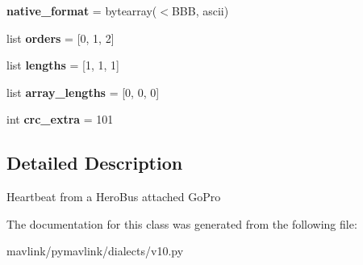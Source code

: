 \begin{DoxyCompactItemize}
{\bfseries native\+\_\+format} = bytearray(\textquotesingle{}$<$B\+BB\textquotesingle{}, \textquotesingle{}ascii\textquotesingle{})
\item 
\mbox{\label{classpymavlink_1_1dialects_1_1v10_1_1MAVLink__gopro__heartbeat__message_a92170198ee2f3575b033a66e56b8da65}} 
list {\bfseries orders} = \mbox{[}0, 1, 2\mbox{]}
\item 
\mbox{\label{classpymavlink_1_1dialects_1_1v10_1_1MAVLink__gopro__heartbeat__message_a717c5d1b495c1ee70707bc9bec2da856}} 
list {\bfseries lengths} = \mbox{[}1, 1, 1\mbox{]}
\item 
\mbox{\label{classpymavlink_1_1dialects_1_1v10_1_1MAVLink__gopro__heartbeat__message_a57c28634d53be667a0bd57bb376b2ea0}} 
list {\bfseries array\+\_\+lengths} = \mbox{[}0, 0, 0\mbox{]}
\item 
\mbox{\label{classpymavlink_1_1dialects_1_1v10_1_1MAVLink__gopro__heartbeat__message_aa9fb5dba55ce7694b42fd55957978a21}} 
int {\bfseries crc\+\_\+extra} = 101
\end{DoxyCompactItemize}


\subsection{Detailed Description}
\begin{DoxyVerb}Heartbeat from a HeroBus attached GoPro
\end{DoxyVerb}
 

The documentation for this class was generated from the following file\+:\begin{DoxyCompactItemize}
\item 
mavlink/pymavlink/dialects/v10.\+py\end{DoxyCompactItemize}
